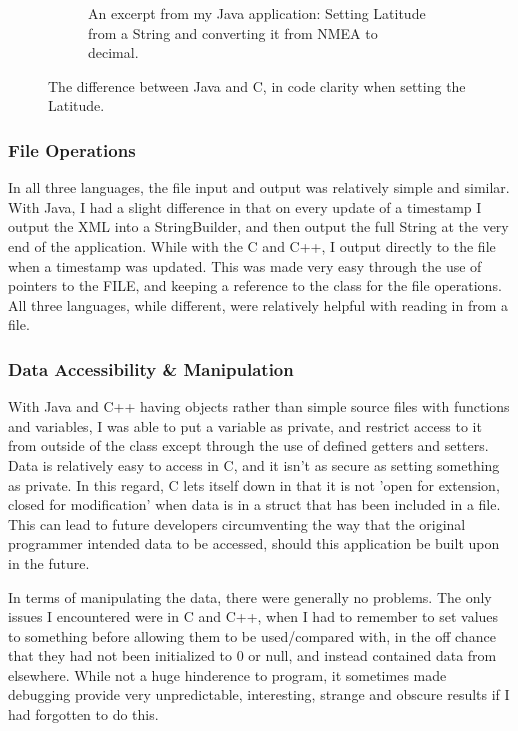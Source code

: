 \documentclass{article}
\begin{document}
\begin{figure}[H]
\begin{subfigure}[b]{0.5\textwidth}
                \caption{An excerpt from my Java application: Setting Latitude from a String and converting it from NMEA to decimal.}
                \label{fig:latjava}
        \end{subfigure}
        \caption{The difference between Java and C, in code clarity when setting the Latitude.}\label{fig:latitudediff}
\end{figure}

\subsubsection{File Operations}

In all three languages, the file input and output was relatively simple and similar. With Java, I had a slight difference in that on every update of a timestamp I output the XML into a StringBuilder, and then output the full String at the very end of the application. While with the C and C++, I output directly to the file when a timestamp was updated. This was made very easy through the use of pointers to the FILE, and keeping a reference to the class for the file operations. All three languages, while different, were relatively helpful with reading in from a file.


\subsubsection{Data Accessibility \& Manipulation}

With Java and C++ having objects rather than simple source files with functions and variables, I was able to put a variable as private, and restrict access to it from outside of the class except through the use of defined getters and setters. Data is relatively easy to access in C, and it isn't as secure as setting something as private. In this regard, C lets itself down in that it is not 'open for extension, closed for modification' when data is in a struct that has been included in a file. This can lead to future developers circumventing the way that the original programmer intended data to be accessed, should this application be built upon in the future.

In terms of manipulating the data, there were generally no problems. The only issues I encountered were in C and C++, when I had to remember to set values to something before allowing them to be used/compared with, in the off chance that they had not been initialized to 0 or null, and instead contained data from elsewhere. While not a huge hinderence to program, it sometimes made debugging provide very unpredictable, interesting, strange and obscure results if I had forgotten to do this.
\end{document}
